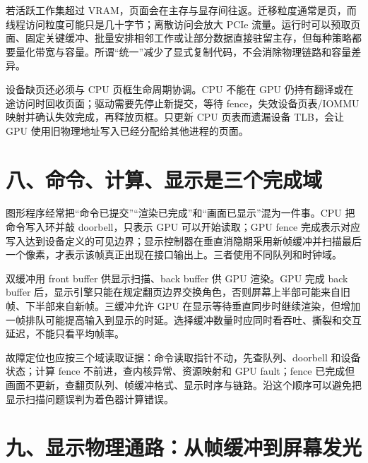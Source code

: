 若活跃工作集超过 VRAM，页面会在主存与显存间往返。迁移粒度通常是页，而线程访问粒度可能只是几十字节；离散访问会放大 PCIe 流量。运行时可以预取页面、固定关键缓冲、批量安排相邻工作或让部分数据直接驻留主存，但每种策略都要量化带宽与容量。所谓“统一”减少了显式复制代码，不会消除物理链路和容量差异。

设备缺页还必须与 CPU 页框生命周期协调。CPU 不能在 GPU 仍持有翻译或在途访问时回收页面；驱动需要先停止新提交，等待 fence，失效设备页表/IOMMU 映射并确认失效完成，再释放页框。只更新 CPU 页表而遗漏设备 TLB，会让 GPU 使用旧物理地址写入已经分配给其他进程的页面。

\section{八、命令、计算、显示是三个完成域}

图形程序经常把“命令已提交”“渲染已完成”和“画面已显示”混为一件事。CPU 把命令写入环并敲 doorbell，只表示 GPU 可以开始读取；GPU fence 完成表示对应写入达到设备定义的可见边界；显示控制器在垂直消隐期采用新帧缓冲并扫描最后一个像素，才表示该帧真正出现在接口输出上。三者使用不同队列和时钟域。

双缓冲用 front buffer 供显示扫描、back buffer 供 GPU 渲染。GPU 完成 back buffer 后，显示引擎只能在规定翻页边界交换角色，否则屏幕上半部可能来自旧帧、下半部来自新帧。三缓冲允许 GPU 在显示等待垂直同步时继续渲染，但增加一帧排队可能提高输入到显示的时延。选择缓冲数量时应同时看吞吐、撕裂和交互延迟，不能只看平均帧率。

故障定位也应按三个域读取证据：命令读取指针不动，先查队列、doorbell 和设备状态；计算 fence 不前进，查内核异常、资源映射和 GPU fault；fence 已完成但画面不更新，查翻页队列、帧缓冲格式、显示时序与链路。沿这个顺序可以避免把显示扫描问题误判为着色器计算错误。




























\section{九、显示物理通路：从帧缓冲到屏幕发光}

